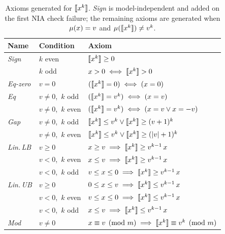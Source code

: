 \begin{table}[ht]
	\centering
	\setlength{\tabcolsep}{1.2em}
	\renewcommand{\arraystretch}{1.3}
	\begin{tabular}{@{}lll@{}}
		\hline
		\textbf{Name}     & \textbf{Condition}     & \textbf{Axiom}                                              \\
		\hline
		\textit{Sign}     & $k$ even               & $\llbracket x^k \rrbracket \geq 0$                                         \\
		                  & $k$ odd                & $x > 0 \iff \llbracket x^k \rrbracket > 0$                                 \\
		\hline
		\textit{Eq-zero}  & $v = 0$                & $(\llbracket x^k \rrbracket = 0) \iff (x = 0)$                             \\
		\hline
		\textit{Eq}       & $v \neq 0$, \,$k$ odd  & $(\llbracket x^k \rrbracket = v^k) \iff (x = v)$                           \\
		                  & $v \neq 0$, \,$k$ even & $(\llbracket x^k \rrbracket = v^k) \iff (x = v \lor x = -v)$               \\
		\hline
		\textit{Gap}      & $v \neq 0$, \,$k$ odd  & $\llbracket x^k \rrbracket \leq v^k \lor \llbracket x^k \rrbracket \geq (v+1)^k$          \\
		                  & $v \neq 0$, \,$k$ even & $\llbracket x^k \rrbracket \leq v^k \lor \llbracket x^k \rrbracket \geq (|v|+1)^k$        \\
		\hline
		\textit{Lin.\,LB} & $v \geq 0$             & $x \geq v \implies \llbracket x^k \rrbracket \geq v^{k-1}\,x$              \\
		                  & $v < 0$, \,$k$ even    & $x \leq v \implies \llbracket x^k \rrbracket \geq v^{k-1}\,x$              \\
		                  & $v < 0$, \,$k$ odd     & $v \leq x \leq 0 \implies \llbracket x^k \rrbracket \geq v^{k-1}\,x$       \\
		\hline
		\textit{Lin.\,UB} & $v \geq 0$             & $0 \leq x \leq v \implies \llbracket x^k \rrbracket \leq v^{k-1}\,x$       \\
		                  & $v < 0$, \,$k$ even    & $v \leq x \leq 0 \implies \llbracket x^k \rrbracket \leq v^{k-1}\,x$       \\
		                  & $v < 0$, \,$k$ odd     & $x \leq v \implies \llbracket x^k \rrbracket \leq v^{k-1}\,x$              \\
		\hline
		\textit{Mod}      & $v \neq 0$             & $x \equiv v \pmod m \implies \llbracket x^k \rrbracket \equiv v^k \pmod m$ \\
		\hline
	\end{tabular}
	\vspace{0.9em}
	\caption{%
		Axioms generated for $\llbracket x^k \rrbracket$. \textit{Sign} is model-independent and added on the first NIA check failure; the remaining axioms are generated when $\mu(x)=v$ and $\mu(\llbracket x^k \rrbracket)\neq v^k$.\label{tab:pow-axioms}}
\end{table}
